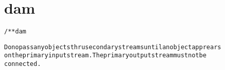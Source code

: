 \section{dam}
\begin{shaded}
\begin{alltt}
/** dam

Do no pass any objects thru secondary streams until an object apprears
on the primary input stream.  The primary output stream must not be
connected.

\end{alltt}
\end{shaded}
